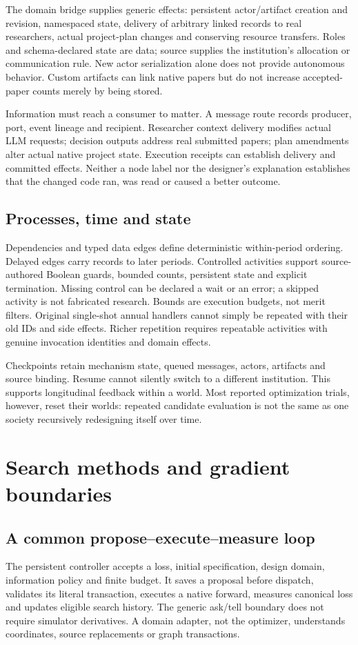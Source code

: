 The domain bridge supplies generic effects: persistent actor/artifact creation
and revision, namespaced state, delivery of arbitrary linked records to real
researchers, actual project-plan changes and conserving resource transfers.
Roles and schema-declared state are data; source supplies the institution's
allocation or communication rule. New actor serialization alone does not
provide autonomous behavior. Custom artifacts can link native papers but do
not increase accepted-paper counts merely by being stored.

Information must reach a consumer to matter. A message route records producer,
port, event lineage and recipient. Researcher context delivery modifies actual
LLM requests; decision outputs address real submitted papers; plan amendments
alter actual native project state. Execution receipts can establish delivery
and committed effects. Neither a node label nor the designer's explanation
establishes that the changed code ran, was read or caused a better outcome.

\subsection{Processes, time and state}
Dependencies and typed data edges define deterministic within-period ordering.
Delayed edges carry records to later periods. Controlled activities support
source-authored Boolean guards, bounded counts, persistent state and explicit
termination. Missing control can be declared a wait or an error; a skipped
activity is not fabricated research. Bounds are execution budgets, not merit
filters. Original single-shot annual handlers cannot simply be repeated with
their old IDs and side effects. Richer repetition requires repeatable activities
with genuine invocation identities and domain effects.

Checkpoints retain mechanism state, queued messages, actors, artifacts and
source binding. Resume cannot silently switch to a different institution.
This supports longitudinal feedback within a world. Most reported optimization
trials, however, reset their worlds: repeated candidate evaluation is not the
same as one society recursively redesigning itself over time.

\section{Search methods and gradient boundaries}
\label{sec:search}
\subsection{A common propose--execute--measure loop}
The persistent controller accepts a loss, initial specification, design domain,
information policy and finite budget. It saves a proposal before dispatch,
validates its literal transaction, executes a native forward, measures canonical
loss and updates eligible search history. The generic ask/tell boundary does
not require simulator derivatives. A domain adapter, not the optimizer,
understands coordinates, source replacements or graph transactions.


